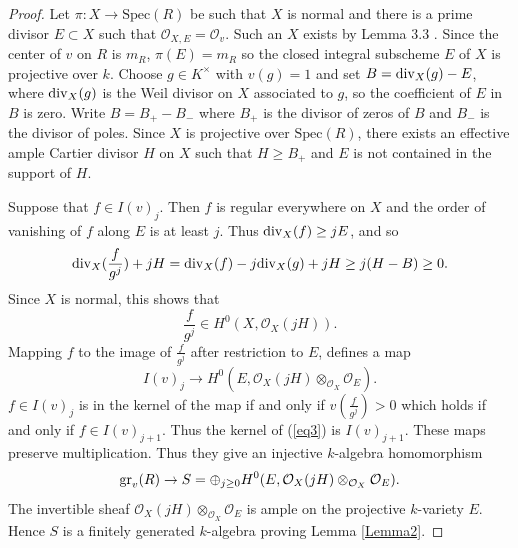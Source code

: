\documentclass[11pt]{amsart}
\theoremstyle{definition}
\let\kappa=\varkappa
\begin{document}
\begin{proof} Let $\pi:X\rightarrow \mbox{Spec}(R)$ be such that $X$ is normal and there is a prime divisor $E\subset X$ such that $\mathcal O_{X,E}=\mathcal O_v$. Such an $X$ exists by Lemma 3.3 \cite{C2}. Since the center of $v$ on $R$ is $m_R$, $\pi(E)=m_R$ so the closed integral subscheme 
$E$ of $X$ is projective over $k$. 
Choose $g\in K^{\times}$ with $v(g)=1$ and set $B={\rm div}_X(g)-E$, where ${\rm div}_X(g)$ is the Weil divisor on $X$ associated to $g$, so the coefficient of $E$ in  $B$ is zero. Write $B=B_+-B_-$ where $B_+$ is the divisor of zeros of $B$ and $B_-$ is the divisor of poles. Since $X$ is projective over $\mbox{Spec}(R)$, there exists an effective ample Cartier divisor $H$ on $X$ such that $H\ge B_+$ and $E$ is not contained in the support of $H$. 

Suppose that  $f\in I(v)_j$. Then  $f$ is regular everywhere on $X$ and the order of vanishing of $f$ along $E$ is at least $j$. Thus ${\rm div}_X(f)\ge jE$, and so
$$
{\rm div}_X(\frac{f}{g^j})+jH={\rm div}_X(f)-j{\rm div}_X(g)+jH\ge j(H-B)\ge 0.
$$
Since $X$ is normal, this shows that
$$
\frac{f}{g^j}\in H^0(X,\mathcal O_X(jH)).
$$
Mapping $f$ to the image of $\frac{f}{g^j}$ after restriction to $E$, defines a map 
\begin{equation}\label{eq3}
I(v)_j\rightarrow H^0(E,\mathcal O_X(jH)\otimes_{\mathcal O_X}\mathcal O_E).
\end{equation}
$f\in I(v)_j$ is in the kernel of the map if and only if $v(\frac{f}{g^j})>0$ which holds if and only if $f\in I(v)_{j+1}$. Thus the kernel of (\ref{eq3}) is $I(v)_{j+1}$. These maps preserve multiplication. Thus they give an injective $k$-algebra homomorphism
$$
{\rm gr}_v(R)\rightarrow S=\oplus_{j\ge 0}H^0(E,\mathcal O_X(jH)\otimes_{\mathcal O_X}\mathcal O_E).
$$
The invertible sheaf $\mathcal O_X(jH)\otimes_{\mathcal O_X}\mathcal O_E$ is ample on the projective $k$-variety $E$. Hence $S$ is a finitely generated $k$-algebra proving Lemma \ref{Lemma2}.
\end{proof}
\end{document}
